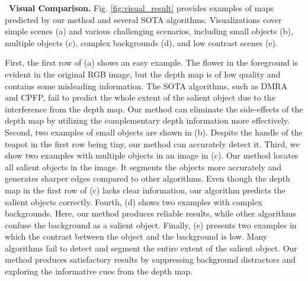 \documentclass[journal]{IEEEtran}
\newcommand{\figref}[1]{Fig. \ref{#1}}
\newcommand{\myPara}[1]{\vspace{10pt}\noindent~\textbf{#1} \quad}
\begin{document}
\myPara{\textbf{Visual Comparison.}}\label{sec:visual_comparison}
\figref{fig:visual_result} provides examples of maps predicted by our method and several SOTA algorithms.
Visualizations cover simple scenes (a) and various challenging scenarios, including small objects (b), multiple objects (c), complex backgrounds (d), and low contrast scenes (e).\par
First, the first row of (a) shows an easy example. The flower in the foreground is evident in the original RGB image, but the depth map is of low quality and contains some misleading information.
The SOTA algorithms, such as DMRA and CPFP, fail to predict the whole extent of the salient object due to the interference from the depth map. Our method can eliminate the side-effects of the depth map by utilizing the complementary depth information more effectively.
Second, two examples of small objects are shown in (b). Despite the handle of the teapot in the first row being tiny, our method can accurately detect it.
Third, we show two examples with multiple objects in an image in (c).
Our method locates all salient objects in the image. It segments the objects more accurately and generates sharper edges compared to other algorithms.
Even though the depth map in the first row of (c) lacks clear information, our algorithm predicts the salient objects correctly.
Fourth, (d) shows two examples with complex backgrounds.
Here, our method produces reliable results, while other algorithms confuse the background as a salient object.
Finally, (e) presents two examples in which the contrast between the object and the background is low.
Many algorithms fail to detect and segment the entire extent of the salient object.
Our method produces satisfactory results by suppressing background distractors and exploring the informative cues from the depth map.
\end{document}
